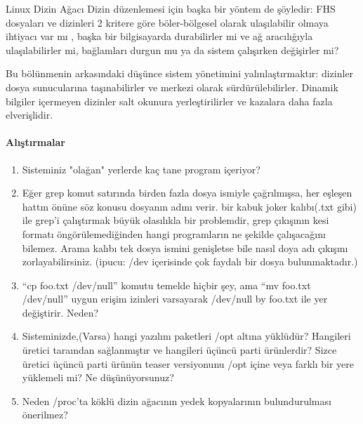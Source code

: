\begin{section}{Linux Dizin Ağacı}
Dizin düzenlemesi için başka bir yöntem de şöyledir: FHS dosyaları ve dizinleri 2 kritere göre böler-bölgesel olarak ulaşılabilir olmaya ihtiyacı var mı , başka bir bilgisayarda durabilirler mi ve ağ aracılığıyla ulaşılabilirler mi, bağlamları durgun mu ya da sistem çalışırken değişirler mi?

Bu bölünmenin arkasındaki düşünce sistem yönetimini yalınlaştırmaktır: dizinler dosya sunucularına taşınabilirler ve merkezi olarak sürdürülebilirler. Dinamik bilgiler içermeyen dizinler salt okunura yerleştirilirler ve kazalara daha fazla elverişlidir.

\paragraph{{\Huge{\PencilLeftDown}}Alıştırmalar}{
\begin{enumerate}
\item Sisteminiz "olağan" yerlerde kaç tane program içeriyor?
\item Eğer grep komut satırında birden fazla dosya ismiyle çağrılmışsa, her eşleşen hattın önüne söz konusu dosyanın adını verir. bir kabuk joker kalıbı(.txt gibi) ile grep'i çalıştırmak büyük olasılıkla bir problemdir, grep çıkışının kesi formatı öngörülemediğinden hangi programların ne şekilde çalışacağını bilemez. Arama kalıbı tek dosya ismini genişletse bile nasıl doya adı çıkışını zorlayabilirsiniz. (ipucu: /dev içerisinde çok faydalı bir dosya bulunmaktadır.)
\item “cp foo.txt /dev/null” komutu temelde hiçbir şey, ama “mv foo.txt /dev/null” uygun erişim izinleri varsayarak /dev/null by foo.txt ile yer değiştirir. Neden?
\item Sisteminizde,(Varsa) hangi yazılım paketleri /opt altına yüklüdür? Hangileri üretici taraından sağlanmıştır ve hangileri üçüncü parti ürünlerdir? Sizce üretici üçüncü parti ürünün teaser versiyonunu /opt içine veya farklı bir yere  yüklemeli mi? Ne düşünüyorsunuz?
\item Neden /proc'ta köklü dizin ağacının yedek kopyalarının bulundurulması önerilmez?
\end{enumerate}
}
\end{section}
